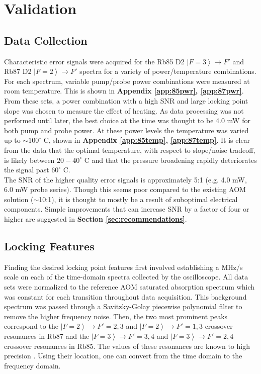 \newpage
\section{Validation}
\label{sec:validation}

\subsection{Data Collection}

Characteristic error signals were acquired for the Rb85 D2 $\left|F=3\right\rangle \rightarrow F'$ and Rb87 D2 $\left|F=2\right\rangle \rightarrow F'$ spectra for a variety of power/temperature combinations. For each spectrum, variable pump/probe power combinations were measured at room temperature. This is shown in \textbf{Appendix \ref{app:85pwr}, \ref{app:87pwr}}. From these sets, a power combination with a high SNR and large locking point slope was chosen to measure the effect of heating. As data processing was not performed until later, the best choice at the time was thought to be 4.0 mW for both pump and probe power. At these power levels the temperature was varied up to $\sim 100^\circ$ C, shown in \textbf{Appendix \ref{app:85temp}, \ref{app:87temp}}. It is clear from the data that the optimal temperature, with respect to slope/noise tradeoff, is likely between $20-40^\circ$ C and that the pressure broadening rapidly deteriorates the signal past $60^\circ$ C. \\

The SNR of the higher quality error signals is approximately 5:1 (e.g. 4.0 mW, 6.0 mW probe series). Though this seems poor compared to the existing AOM solution ($\sim$10:1), it is thought to mostly be a result of suboptimal electrical components. Simple improvements that can increase SNR by a factor of four or higher are suggested in \textbf{Section \ref{sec:recommendations}}.

\subsection{Locking Features}

Finding the desired locking point features first involved establishing a MHz/s scale on each of the time-domain spectra collected by the oscilloscope. All data sets were normalized to the reference AOM saturated absorption spectrum which was constant for each transition throughout data acquisition. This background spectrum was passed through a Savitzky-Golay piecewise polynomial filter to remove the higher frequency noise. Then, the two most prominent peaks correspond to the $\left|F=2\right\rangle \rightarrow F'=2,3$ and  $\left|F=2\right\rangle \rightarrow F'=1,3$ crossover resonances in Rb87 and the $\left|F=3\right\rangle \rightarrow F'=3,4$ and  $\left|F=3\right\rangle \rightarrow F'=2,4$ crossover resonances in Rb85.  The values of these resonances are known to high precision \cite{steckrb85, steckrb87}. Using their location, one can convert from the time domain to the frequency domain. \\

